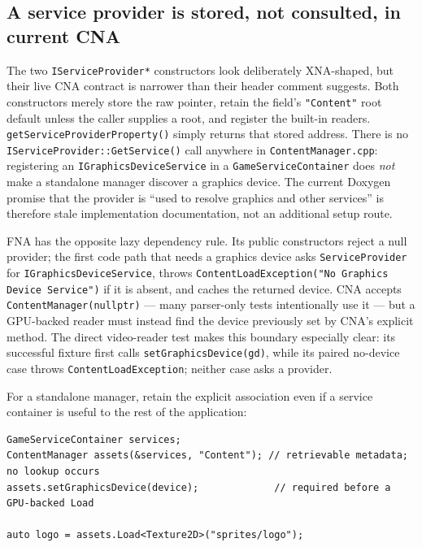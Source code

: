 \subsection{A service provider is stored, not consulted, in current CNA}

The two \texttt{IServiceProvider*} constructors look deliberately XNA-shaped, but their live
CNA contract is narrower than their header comment suggests. Both constructors merely store the
raw pointer, retain the field's \texttt{"Content"} root default unless the caller supplies a
root, and register the built-in readers. \texttt{getServiceProviderProperty()} simply returns
that stored address. There is no \texttt{IServiceProvider::GetService()} call anywhere in
\texttt{ContentManager.cpp}: registering an \texttt{IGraphicsDeviceService} in a
\texttt{GameServiceContainer} does \emph{not} make a standalone manager discover a graphics
device. The current Doxygen promise that the provider is ``used to resolve graphics and other
services'' is therefore stale implementation documentation, not an additional setup route.

FNA has the opposite lazy dependency rule. Its public constructors reject a null provider; the
first code path that needs a graphics device asks \texttt{ServiceProvider} for
\texttt{IGraphicsDeviceService}, throws \texttt{ContentLoadException("No Graphics Device
Service")} if it is absent, and caches the returned device. CNA accepts
\texttt{ContentManager(nullptr)} --- many parser-only tests intentionally use it --- but a
GPU-backed reader must instead find the device previously set by CNA's explicit method. The
direct video-reader test makes this boundary especially clear: its successful fixture first calls
\texttt{setGraphicsDevice(gd)}, while its paired no-device case throws
\texttt{ContentLoadException}; neither case asks a provider.

For a standalone manager, retain the explicit association even if a service container is useful
to the rest of the application:

\begin{lstlisting}
GameServiceContainer services;
ContentManager assets(&services, "Content"); // retrievable metadata; no lookup occurs
assets.setGraphicsDevice(device);             // required before a GPU-backed Load

auto logo = assets.Load<Texture2D>("sprites/logo");
\end{lstlisting}

